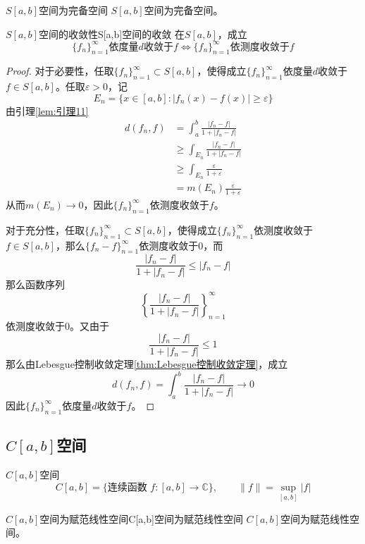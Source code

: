 \documentclass[lang = cn, scheme = chinese, thmcnt = section]{elegantbook}
\newcommand{\C}{\mathbb{C}}  		   %
\newcommand{\sub}{\subset}             %
\begin{document}
\begin{proposition}{$S[a,b]$空间为完备空间}
	$S[a,b]$空间为完备空间。
\end{proposition}

\begin{proposition}{$S[a,b]$空间的收敛性}{S[a,b]空间的收敛}
	在$S[a,b]$，成立
	$$
	\{f_n\}_{n=1}^{\infty}\text{依度量}d\text{收敛于}f\iff \{f_n\}_{n=1}^{\infty}\text{依测度收敛于}f
	$$
\end{proposition}

\begin{proof}
	对于必要性，任取$\{f_n\}_{n=1}^{\infty}\sub S[a,b]$，使得成立$\{f_n\}_{n=1}^{\infty}$依度量$d$收敛于$f\in S[a,b]$。任取$\varepsilon>0$，记
	$$
	E_n=\{ x\in [a,b]:|f_n(x)-f(x)|\ge \varepsilon \}
	$$
	由引理\ref{lem:引理11}
	\begin{align*}
		d(f_n,f)
		& = \int_a^b\frac{|f_n-f|}{1+|f_n-f|}\\
		& \ge \int_{E_n}\frac{|f_n-f|}{1+|f_n-f|}\\
		& \ge \int_{E_n}\frac{\varepsilon}{1+\varepsilon}\\
		& = m(E_n)\frac{\varepsilon}{1+\varepsilon}
	\end{align*}
	从而$m(E_n)\to 0$，因此$\{f_n\}_{n=1}^{\infty}$依测度收敛于$f$。
	
	对于充分性，任取$\{f_n\}_{n=1}^{\infty}\sub S[a,b]$，使得成立$\{f_n\}_{n=1}^{\infty}$依测度收敛于$f\in S[a,b]$，那么$\{ f_n-f \}_{n=1}^{\infty}$依测度收敛于$0$，而
	$$
	\frac{|f_n-f|}{1+|f_n-f|}\le |f_n-f|
	$$
	那么函数序列
	$$
	\left\{ \frac{|f_n-f|}{1+|f_n-f|}\right\}_{n=1}^{\infty}
	$$
	依测度收敛于$0$。又由于
	$$
	\frac{|f_n-f|}{1+|f_n-f|}\le 1
	$$
	那么由Lebesgue控制收敛定理\ref{thm:Lebesgue控制收敛定理}，成立
	$$
	d(f_n,f)=\int_a^b\frac{|f_n-f|}{1+|f_n-f|}\to0
	$$
	因此$\{f_n\}_{n=1}^{\infty}$依度量$d$收敛于$f$。
\end{proof}

\subsection{$C[a,b]$空间}

\begin{definition}{$C[a,b]$空间}
	$$
	C[a,b]=\{\text{连续函数 }f:[a,b]\to\C\},\qquad 
	\|f\|=\sup_{[a,b]}|f|
	$$
\end{definition}

\begin{proposition}{$C[a,b]$空间为赋范线性空间}{C[a,b]空间为赋范线性空间}
	$C[a,b]$空间为赋范线性空间。
\end{proposition}
\end{document}
